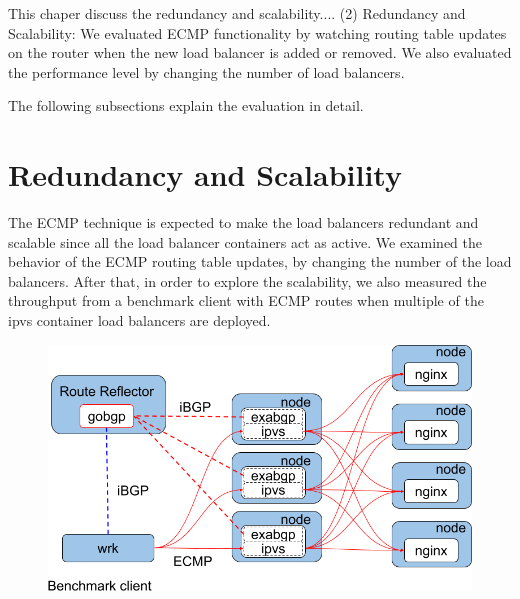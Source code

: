 

This chaper discuss the redundancy and scalability....
(2) Redundancy and Scalability:
We evaluated ECMP functionality by watching routing table updates on the router when the new load balancer is added or removed.
We also evaluated the performance level by changing the number of load balancers.

The following subsections explain the evaluation in detail.



\section{Redundancy and Scalability}

The ECMP technique is expected to make the load balancers redundant and scalable since all the load balancer containers act as active.
We examined the behavior of the ECMP routing table updates, by changing the number of the load balancers.
After that, in order to explore the scalability, we also measured the throughput from a benchmark client with ECMP routes when multiple of the ipvs container load balancers are deployed.

\begin{figure}[b]
    \includegraphics[width=0.9\columnwidth]{Figs/lb_ecmp_schem}
    \caption{}
    \label{fig:lb_ecmp_schem}
\end{figure}

